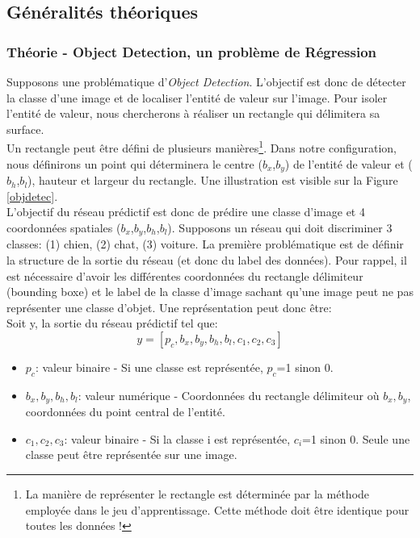 \subsection{Généralités théoriques}
\subsubsection{Théorie - Object Detection, un problème de Régression}
Supposons une problématique d'\textit{Object Detection}. L'objectif est donc de détecter la classe d'une image et de localiser l'entité de valeur sur l'image. Pour isoler l'entité de valeur, nous chercherons à réaliser un rectangle qui délimitera sa surface.\\

\noindent Un rectangle peut être défini de plusieurs manières\footnote{La manière de représenter le rectangle est déterminée par la méthode employée dans le jeu d'apprentissage. Cette méthode doit être identique pour toutes les données !}. Dans notre configuration, nous définirons un point qui déterminera le centre ($b_x$,$b_y$) de l'entité de valeur et ($b_h$,$b_l$), hauteur et largeur du rectangle. Une illustration est visible sur la Figure \ref{objdetec}.\\

\noindent L'objectif du réseau prédictif est donc de prédire une classe d'image et 4 coordonnées spatiales ($b_x$,$b_y$,$b_h$,$b_l$). Supposons un réseau qui doit discriminer 3 classes: (1) chien, (2) chat, (3) voiture. La première problématique est de définir la structure de la sortie du réseau (et donc du label des données). Pour rappel, il est nécessaire d'avoir les différentes coordonnées du rectangle délimiteur (bounding boxe) et le label de la classe d'image sachant qu'une image peut ne pas représenter une classe d'objet. Une représentation peut donc être:\\

\noindent Soit y, la sortie du réseau prédictif tel que: $$y=[p_c,b_x,b_y,b_h,b_l,c_1,c_2,c_3]$$
\begin{itemize}
    \item $p_c$: valeur binaire - Si une classe est représentée, $p_c$=1 sinon 0.
    \item $b_x,b_y,b_h,b_l$: valeur numérique - Coordonnées du rectangle délimiteur où $b_x,b_y$, coordonnées du point central de l'entité.
    \item $c_1,c_2,c_3$: valeur binaire - Si la classe i est représentée, $c_i$=1 sinon 0. Seule une classe peut être représentée sur une image.
\end{itemize}

